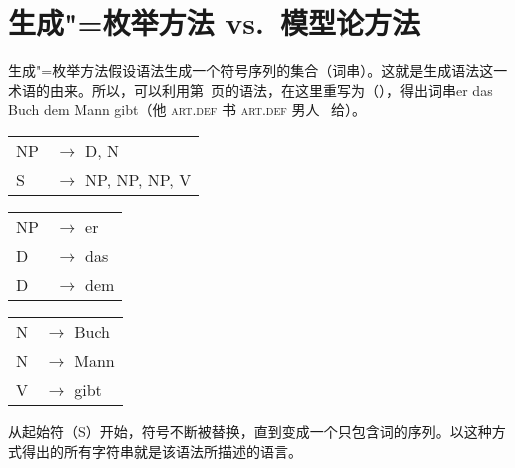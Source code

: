 
\chapter{生成"=枚举方法 vs.\ 模型论方法}
\label{Abschnitt-Generativ-Modelltheoretisch}

生成"=枚举方法假设语法生成一个符号序列的集合（词串）。这就是生成语法这一术语的由来。所以，可以利用第~\pageref{bsp-grammatik-psg}页的语法，在这里重写为（），得出词串er das Buch dem Mann gibt（他 \textsc{art}.\textsc{def} 书 \textsc{art}.\textsc{def} 男人 \, 给）。
\ea
\label{bsp-grammatik-psg-zwei}
\begin{tabular}[t]{@{}l@{ }l}
{NP} & {$\to$ D, N}\\          
{S}  & {$\to$ NP, NP, NP, V}
\end{tabular}\hspace{2cm}%
\begin{tabular}[t]{@{}l@{ }l}
{NP} & {$\to$ er}\\
{D}  & {$\to$ das}\\
{D}  & {$\to$ dem}\\
\end{tabular}\hspace{8mm}
\begin{tabular}[t]{@{}l@{ }l}
{N} & {$\to$ Buch}\\
{N} & {$\to$ Mann}\\
{V} & {$\to$ gibt}\\
\end{tabular}
\z
从起始符（S）开始，符号不断被替换，直到变成一个只包含词的序列。以这种方式得出的所有字符串就是该语法所描述的语言。

